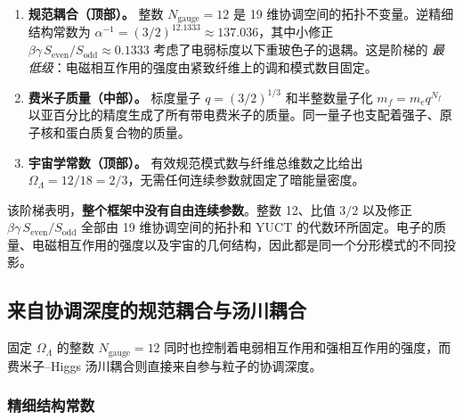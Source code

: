 \documentclass[12pt,a4paper]{article}
\begin{document}
	\begin{enumerate}[leftmargin=*]
		\item \textbf{规范耦合（顶部）。} 整数 \(N_{\mathrm{gauge}} = 12\) 是 19 维协调空间的拓扑不变量。逆精细结构常数为 \(\alpha^{-1} = (3/2)^{12.1333} \approx 137.036\)，其中小修正 \(\beta\gamma\,S_{\mathrm{even}}/S_{\mathrm{odd}} \approx 0.1333\) 考虑了电弱标度以下重玻色子的退耦。这是阶梯的 \emph{最低级}：电磁相互作用的强度由紧致纤维上的调和模式数目固定。
		\item \textbf{费米子质量（中部）。} 标度量子 \(q = (3/2)^{1/3}\) 和半整数量子化 \(m_f = m_e q^{N_f}\) 以亚百分比的精度生成了所有带电费米子的质量。同一量子也支配着强子、原子核和蛋白质复合物的质量。
		\item \textbf{宇宙学常数（顶部）。} 有效规范模式数与纤维总维数之比给出 \(\Omega_\Lambda = 12/18 = 2/3\)，无需任何连续参数就固定了暗能量密度。
	\end{enumerate}
	
	该阶梯表明，\textbf{整个框架中没有自由连续参数}。整数 12、比值 \(3/2\) 以及修正 \(\beta\gamma\,S_{\mathrm{even}}/S_{\mathrm{odd}}\) 全部由 19 维协调空间的拓扑和 YUCT 的代数环所固定。电子的质量、电磁相互作用的强度以及宇宙的几何结构，因此都是同一个分形模式的不同投影。
	
	\subsection{来自协调深度的规范耦合与汤川耦合}
	
	固定 \(\Omega_\Lambda\) 的整数 \(N_{\mathrm{gauge}} = 12\) 同时也控制着电弱相互作用和强相互作用的强度，而费米子–Higgs 汤川耦合则直接来自参与粒子的协调深度。
	
	\subsubsection{精细结构常数}
	
\end{document}
